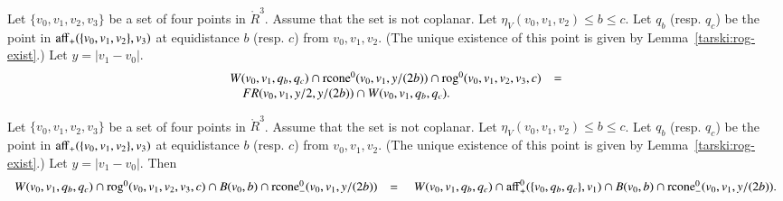 \begin{tarskidata}
\begin{tarski}
\begin{proved}
\swallowed\end{proved}
\end{tarski}





\begin{tarski}

\begin{lemma}
Let $\{v_0,v_1,v_2,v_3\}$ be a set of four points in $\ring{R}^3$.
Assume that the set is not coplanar.
Let $\eta_V(v_0,v_1,v_2)\le b \le c$.  
Let $q_b$ (resp. $q_c$) be the point
in ${\operatorname{aff}}_+(\{v_0,v_1,v_2\},v_3)$ at equidistance $b$ (resp. $c$)
from $v_0,v_1,v_2$.  (The unique existence of this point is given
by Lemma~\ref{tarski:rog-exist}.)   Let $y = |v_1-v_0|$.
$$
\begin{array}{lll}
W(v_0,v_1,q_b,q_c) \cap {\operatorname{rcone}}^0(v_0,v_1,y/(2b))
\cap {\operatorname{rog}}^0(v_0,v_1,v_2,v_3,c) &=\\
\quad FR(v_0,v_1,y/2,y/(2b))\cap W(v_0,v_1,q_b,q_c).
\end{array}
$$
\end{lemma}

\begin{proved}
\swallowed\end{proved}
\end{tarski}





\begin{tarski}

\begin{lemma}
Let $\{v_0,v_1,v_2,v_3\}$ be a set of four points in $\ring{R}^3$.
Assume that the set is not coplanar.
Let $\eta_V(v_0,v_1,v_2)\le b \le c$.  
Let $q_b$ (resp. $q_c$) be the point
in ${\operatorname{aff}}_+(\{v_0,v_1,v_2\},v_3)$ at equidistance $b$ (resp. $c$)
from $v_0,v_1,v_2$.  (The unique existence of this point is given
by Lemma~\ref{tarski:rog-exist}.)   Let $y = |v_1-v_0|$.
Then
$$
\begin{array}{lll}
W(v_0,v_1,q_b,q_c)  \cap {\operatorname{rog}}^0(v_0,v_1,v_2,v_3,c)\cap
B(v_0,b) \cap {\operatorname{rcone}}_-^0(v_0,v_1,y/(2b)) &=
\quad
W(v_0,v_1,q_b,q_c)  \cap {\operatorname{aff}}_+^0(\{v_0,q_b,q_c\},v_1)\cap
B(v_0,b) \cap {\operatorname{rcone}}_-^0(v_0,v_1,y/(2b)).
\end{array}
$$
\end{lemma}


\end{tarski}
\end{tarskidata}
